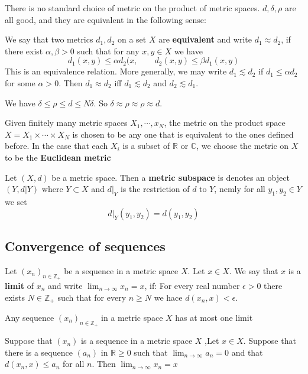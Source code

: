 There is no standard choice of metric on the product of metric spaces.  $ d,\delta,\rho $ are all good, and they are equivalent in the following sense:
\begin{definition}
    We say that two metrics  $ d_1,d_2 $ on a set  $ X  $ are \textbf{equivalent} and write  $ d_1\approx d_2 $, if there exist  $ \alpha,\beta>0  $ such that for any  $ x,y\in X  $ we have 
    \[d_1(x,y) \leq \alpha d_2(x,\qquad d_2(x,y) \leq \beta d_1(x,y)\]
    This is an equivalence relation. More generally, we may write  $ d_1\lesssim d_2 $ if  $ d_1 \leq\alpha d_2  $ for some  $ \alpha>0  $. Then  $ d_1\approx d_2  $ iff  $ d_1\lesssim d_2 $ and  $ d_2\lesssim d_1 $.   
\end{definition}
\begin{example}
    We have  $ \delta \leq\rho \leq d \leq N\delta $. So  $ \delta\approx\rho\approx\rho \approx d $.  
\end{example}
Given finitely many metric spaces  $ X_1,\cdots,x_N $,  the metric on the product space  $ X=X_1\times \cdots\times X_N  $ is chosen to be any one that is equivalent to the ones defined before. In the case that each  $ X_i  $ is a subset of  $ \mathbb{R } $  or  $ \mathbb{C}  $, we choose the metric on  $ X  $ to be the \textbf{Euclidean metric}
\begin{definition}
    Let  $ (X,d) $ be a metric space. Then a \textbf{metric subspace} is denotes an object  $ (Y,d|Y) $ where  $ Y\subset X  $ and  $ d|_Y  $ is the restriction of  $ d  $ to  $ Y  $, nemly for all  $ y_1,y_2\in Y  $ we set \[d|_Y(y_1,y_2)=d(y_1,y_2)\]
\end{definition}
\subsection{Convergence of sequences}
\begin{definition}
    Let  $ (x_n)_{n\in \mathbb{Z}_+} $ be a sequence in a metric space  $ X  $. Let  $ x\in X  $. We say that  $ x  $ is a \textbf{limit }of  $ x_n  $ and write  $ \lim_{n \to \infty} x_n =x $, if: For every real number  $ \epsilon>0  $ there exists  $ N\in \mathbb{Z}_+  $ such that for every  $ n \geq N  $ we hace  $ d(x_n,x)<\epsilon $.   
\end{definition}
\begin{proposition}
    Any sequence  $ (x_n)_{n\in \mathbb{Z}_+}  $ in a metric space  $ X  $ has at most one limit
\end{proposition}
\begin{proposition}
    Suppose that  $ (x_n ) $ is a sequence in a metric space  $ X  $ ,Let  $ x\in X $. Suppose that there is a sequence  $ (a_n ) $ in  $ \mathbb{R } {\geq 0} $ such that  $ \lim_{n  \to \infty} a_n=0  $ and that  $ d(x_n,x ) \leq a_n  $ for all  $ n  $. Then  $ \lim_{n  \to \infty} x_n=x $  
\end{proposition}